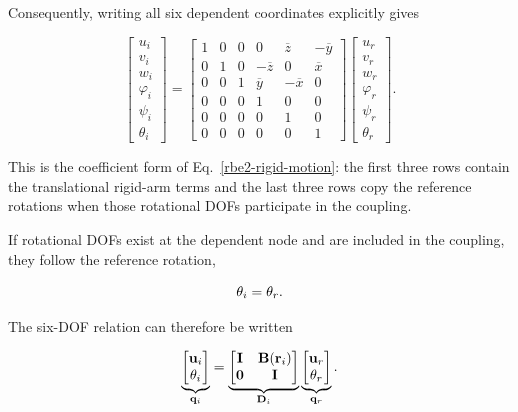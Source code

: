 Consequently, writing all six dependent coordinates explicitly gives

\begin{equation}\label{rbe2-component-six-dof-relation}
\begin{bmatrix}
    u_i\\v_i\\w_i\\\varphi_i\\\psi_i\\\theta_i
\end{bmatrix}
=
\begin{bmatrix}
    1&0&0&0&\overline{z}&-\overline{y}\\
    0&1&0&-\overline{z}&0&\overline{x}\\
    0&0&1&\overline{y}&-\overline{x}&0\\
    0&0&0&1&0&0\\
    0&0&0&0&1&0\\
    0&0&0&0&0&1
\end{bmatrix}
\begin{bmatrix}
    u_r\\v_r\\w_r\\\varphi_r\\\psi_r\\\theta_r
\end{bmatrix}.
\end{equation}

This is the coefficient form of Eq.~\eqref{rbe2-rigid-motion}: the first three
rows contain the translational rigid-arm terms and the last three rows copy the
reference rotations when those rotational DOFs participate in the coupling.

If rotational DOFs exist at the dependent node and are included in the coupling,
they follow the reference rotation,

\begin{equation}
    \mathbf{\theta}_i=\mathbf{\theta}_r.
\end{equation}

The six-DOF relation can therefore be written

\begin{bbox}[0.92]
\begin{equation}\label{rbe2-single-node-transformation}
    \underbrace{
    \begin{bmatrix}
        \mathbf{u}_i\\
        \mathbf{\theta}_i
    \end{bmatrix}}_{\mathbf{q}_i}
    =
    \underbrace{
    \begin{bmatrix}
        \mathbf{I} & \mathbf{B}(\mathbf{r}_i)\\
        \mathbf{0} & \mathbf{I}
    \end{bmatrix}}_{\mathbf{D}_i}
    \underbrace{
    \begin{bmatrix}
        \mathbf{u}_r\\
        \mathbf{\theta}_r
    \end{bmatrix}}_{\mathbf{q}_r}.
\end{equation}
\end{bbox}

